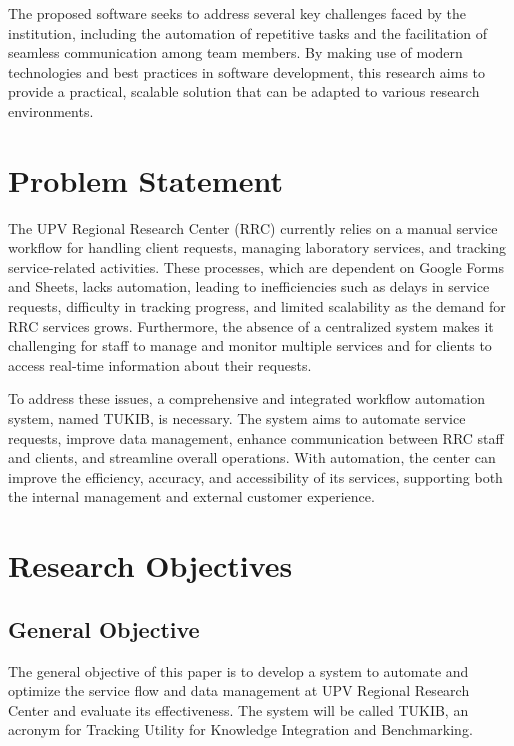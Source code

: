The proposed software seeks to address several key challenges faced by the institution, including the automation of repetitive tasks and the facilitation of seamless communication among team members. By making use of modern technologies and best practices in software development, this research aims to provide a practical, scalable solution that can be adapted to various research environments.

\section{Problem Statement}

The UPV Regional Research Center (RRC) currently relies on a manual service workflow for handling client requests, managing laboratory services, and tracking service-related activities. These processes, which are dependent on Google Forms and Sheets, lacks automation, leading to inefficiencies such as delays in service requests, difficulty in tracking progress, and limited scalability as the demand for RRC services grows. Furthermore, the absence of a centralized system makes it challenging for staff to manage and monitor multiple services and for clients to access real-time information about their requests.

To address these issues, a comprehensive and integrated workflow automation system, named TUKIB, is necessary. The system aims to automate service requests, improve data management, enhance communication between RRC staff and clients, and streamline overall operations. With automation, the center can improve the efficiency, accuracy, and accessibility of its services, supporting both the internal management and external customer experience.

\section{Research Objectives}
\label{sec:researchobjectives}

\subsection{General Objective}
\label{sec:generalobjective}

The general objective of this paper is to develop a system to automate and optimize the service flow and data management at UPV Regional Research Center and evaluate its effectiveness. The system will be called TUKIB, an acronym for Tracking Utility for Knowledge Integration and Benchmarking. 

